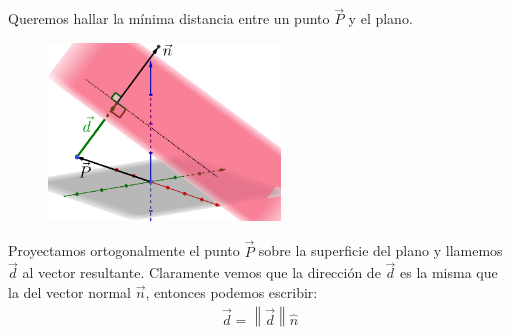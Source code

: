 \documentclass[12pt, fleqn]{report}                             %
\theoremstyle{break}                                            %
\newcommand{\Abs}[1]{\left\lVert #1 \right\lVert}               %
\begin{document}
            Queremos hallar la mínima distancia entre un punto $\vec{P}$ y el plano.
            
            \begin{figure}[H]
                \centering
                \includegraphics[width=0.55\textwidth]{distancePointPlane}
            \end{figure}
            
            Proyectamos ortogonalmente el punto $\vec{P}$ sobre la superficie del plano y llamemos $\vec{d}$ al vector resultante.
            Claramente vemos que la dirección de $\vec{d}$ es la misma que la del vector normal $\vec{n}$, entonces podemos escribir:
            \begin{align}
                \vec{d} = \Abs{\vec{d}} \hat{n}
            \end{align}
            
            \clearpage
\end{document}

